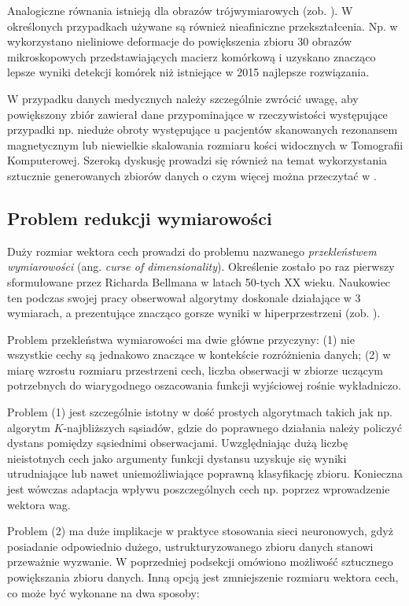 Analogiczne równania istnieją dla obrazów trójwymiarowych (zob. \cite{Hill06}). W określonych przypadkach używane są również nieafiniczne przekształcenia. Np. w \cite{DBLP:journals/corr/RonnebergerFB15} wykorzystano nieliniowe deformacje do powiększenia zbioru 30 obrazów mikroskopowych przedstawiających macierz komórkową i uzyskano znacząco lepsze wyniki detekcji komórek niż istniejące w 2015 najlepsze rozwiązania.

W przypadku danych medycznych należy szczególnie zwrócić uwagę, aby powiększony zbiór zawierał dane przypominające w rzeczywistości występujące przypadki np. nieduże obroty występujące u pacjentów skanowanych rezonansem magnetycznym lub niewielkie skalowania rozmiaru kości widocznych w Tomografii Komputerowej. Szeroką dyskusję prowadzi się również na temat wykorzystania sztucznie generowanych zbiorów danych o czym więcej można przeczytać w \cite{DBLP:journals/corr/SixtWL16, Litjens2017}. 

\subsection{Problem redukcji wymiarowości}
\label{DimReduction}
Duży rozmiar wektora cech prowadzi do problemu nazwanego \textit{przekleństwem wymiarowości} (ang. \textit{curse of dimensionality}). Określenie zostało po raz pierwszy sformułowane przez Richarda Bellmana w latach 50-tych XX wieku. Naukowiec ten podczas swojej pracy obserwował algorytmy doskonale działające w 3 wymiarach, a prezentujące znacząco gorsze wyniki w hiperprzestrzeni (zob. \cite{Bellman:1957}). 

Problem przekleństwa wymiarowości ma dwie główne przyczyny: (1) nie wszystkie cechy są jednakowo znaczące w kontekście rozróżnienia danych; (2) w miarę wzrostu rozmiaru przestrzeni cech, liczba obserwacji w zbiorze uczącym potrzebnych do wiarygodnego oszacowania funkcji wyjściowej rośnie wykładniczo.  

Problem (1) jest szczególnie istotny w dość prostych algorytmach takich jak np. algorytm $K$-najbliższych sąsiadów, gdzie do poprawnego działania należy policzyć dystans pomiędzy sąsiednimi obserwacjami. Uwzględniając dużą liczbę nieistotnych cech jako argumenty funkcji dystansu uzyskuje się wyniki utrudniające lub nawet uniemożliwiające poprawną klasyfikację zbioru. Konieczna jest wówczas adaptacja wpływu poszczególnych cech np. poprzez wprowadzenie wektora wag.

Problem (2) ma duże implikacje w praktyce stosowania sieci neuronowych, gdyż posiadanie odpowiednio dużego, ustrukturyzowanego zbioru danych stanowi przeważnie wyzwanie. W poprzedniej podsekcji omówiono możliwość sztucznego powiększania zbioru danych. Inną opcją jest zmniejszenie rozmiaru wektora cech, co może być wykonane na dwa sposoby:

